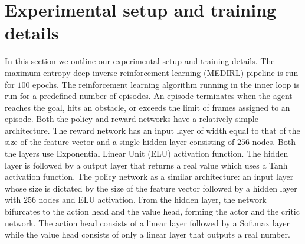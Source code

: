 \section{Experimental setup and training details}
\label{sec:exp-setup}
In this section we outline our experimental setup and training details. The maximum entropy deep inverse reinforcement learning (MEDIRL) pipeline is run for $100$ epochs. The reinforcement learning algorithm \cite{mnih_actor_critic_2016} running in the inner loop is run for a predefined number of episodes. An episode terminates when the agent reaches the goal, hits an obstacle, or exceeds the limit of frames assigned to an episode. Both the policy and reward networks have a relatively simple architecture. The reward network has an input layer of width equal to that of the size of the feature vector and a single hidden layer consisting of $256$ nodes. Both the layers use Exponential Linear Unit (ELU) \cite{elu} activation function. The hidden layer is followed by a output layer that returns a real value which uses a Tanh activation function. The policy network as a similar architecture: an input layer whose size is dictated by the size of the feature vector followed by a hidden layer with $256$ nodes and ELU activation. From the hidden layer, the network bifurcates to the action head and the value head, forming the actor and the critic network. The action head consists of a linear layer followed by a Softmax layer while the value head consists of only a linear layer that outputs a real number.



